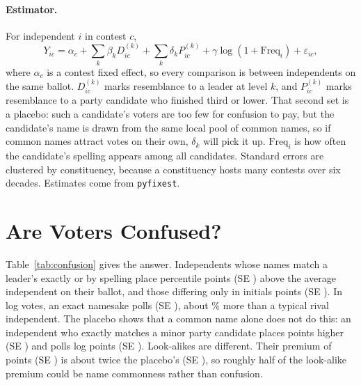 \documentclass[11pt]{article}
\begin{document}
\paragraph{Estimator.} For independent $i$ in contest $c$,
\begin{equation}
Y_{ic} = \alpha_c + \sum_{k} \beta_{k} D_{ic}^{(k)} + \sum_{k} \delta_{k} P_{ic}^{(k)} + \gamma \log(1 + \text{Freq}_{i}) + \varepsilon_{ic},
\end{equation}
where $\alpha_c$ is a contest fixed effect, so every comparison is between independents on the same ballot. $D^{(k)}_{ic}$ marks resemblance to a leader at level $k$, and $P^{(k)}_{ic}$ marks resemblance to a party candidate who finished third or lower. That second set is a placebo: such a candidate's voters are too few for confusion to pay, but the candidate's name is drawn from the same local pool of common names, so if common names attract votes on their own, $\delta_k$ will pick it up. $\text{Freq}_i$ is how often the candidate's spelling appears among all candidates. Standard errors are clustered by constituency, because a constituency hosts many contests over six decades. Estimates come from \texttt{pyfixest}.

\section{Are Voters Confused?}

Table~\ref{tab:confusion} gives the answer. Independents whose names match a leader's exactly or by spelling place \rkExact{} percentile points (SE \rkExactSe) above the average independent on their ballot, and those differing only in initials \rkInit{} points (SE \rkInitSe). In log votes, an exact namesake polls \lgExact{} (SE \lgExactSe), about \lgExactPct\% more than a typical rival independent. The placebo shows that a common name alone does not do this: an independent who exactly matches a minor party candidate places \rkPlExact{} points higher (SE \rkPlExactSe) and polls \lgPlExact{} log points (SE \lgPlExactSe). Look-alikes are different. Their premium of \rkLook{} points (SE \rkLookSe) is about twice the placebo's \rkPlLook{} (SE \rkPlLookSe), so roughly half of the look-alike premium could be name commonness rather than confusion.

\begin{table}[htbp]
\centering\small
\caption{Do independents who resemble a leader poll more than other independents on the same ballot?}
\label{tab:confusion}

\end{table}
\end{document}
